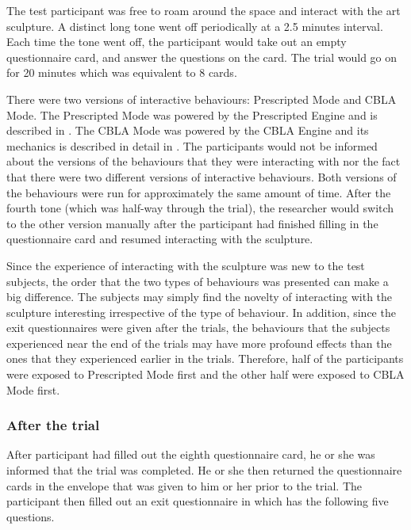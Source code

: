 The test participant was free to roam around the space and interact with the art sculpture. A distinct long tone went off periodically at a 2.5 minutes interval. Each time the tone went off, the participant would take out an empty questionnaire card, and answer the questions on the card. The trial would go on for 20 minutes which was equivalent to 8 cards.

There were two versions of interactive behaviours: Prescripted Mode and CBLA Mode. The Prescripted Mode was powered by the Prescripted Engine and is described in . The CBLA Mode was powered by the CBLA Engine and its mechanics is described in detail in . The participants would not be informed about the versions of the behaviours that they were interacting with nor the fact that there were two different versions of interactive behaviours. Both versions of the behaviours were run for approximately the same amount of time. After the fourth tone (which was half-way through the trial), the researcher would switch to the other version manually after the participant had finished filling in the questionnaire card and resumed interacting with the sculpture. 

Since the experience of interacting with the sculpture was new to the test subjects, the order that the two types of behaviours was presented can make a big difference. The subjects may simply find the novelty of interacting with the sculpture interesting irrespective of the type of behaviour. In addition, since the exit questionnaires were given after the trials, the behaviours that the subjects experienced near the end of the trials may have more profound effects than the ones that they experienced earlier in the trials. Therefore, half of the participants were exposed to Prescripted Mode first and the other half were exposed to CBLA Mode first.

\subsubsection{After the trial}

After participant had filled out the eighth questionnaire card, he or she was informed that the trial was completed. He or she then returned the questionnaire cards in the envelope that was given to him or her prior to the trial. The participant then filled out an exit questionnaire in  which has the following five questions.

